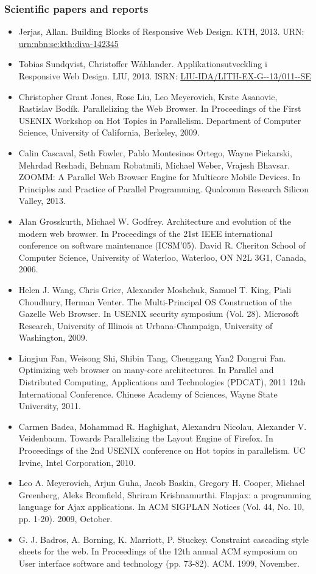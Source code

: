 \documentclass[oneside,a4paper,11pt]{kth-mag}
\begin{document}
\subsubsection{Scientific papers and reports}
\begin{itemize}
\item Jerjas, Allan. Building Blocks of Responsive Web Design. KTH, 2013. URN: \url{urn:nbn:se:kth:diva-142345}
\item Tobias Sundqvist, Christoffer Wåhlander. Applikationsutveckling i Responsive Web Design. LIU, 2013. ISRN: \url{LIU-IDA/LITH-EX-G--13/011--SE}
\item Christopher Grant Jones, Rose Liu, Leo Meyerovich, Krste Asanovic, Rastislav Bodík. Parallelizing the Web Browser. In Proceedings of the First USENIX Workshop on Hot Topics in Parallelism. Department of Computer Science, University of California, Berkeley, 2009.
\item Calin Cascaval, Seth Fowler, Pablo Montesinos Ortego, Wayne Piekarski, Mehrdad Reshadi, Behnam Robatmili, Michael Weber, Vrajesh Bhavsar. ZOOMM: A Parallel Web Browser Engine for Multicore Mobile Devices. In Principles and Practice of Parallel Programming. Qualcomm Research Silicon Valley, 2013.
\item Alan Grosskurth, Michael W. Godfrey. Architecture and evolution of the modern web browser. In Proceedings of the 21st IEEE international conference on software maintenance (ICSM'05). David R. Cheriton School of Computer Science, University of Waterloo, Waterloo, ON N2L 3G1, Canada, 2006.
\item Helen J. Wang, Chris Grier, Alexander Moshchuk, Samuel T. King, Piali Choudhury, Herman Venter. The Multi-Principal OS Construction of the Gazelle Web Browser. In USENIX security symposium (Vol. 28). Microsoft Research, University of Illinois at Urbana-Champaign, University of Washington, 2009.
\item Lingjun Fan, Weisong Shi, Shibin Tang, Chenggang Yan2 Dongrui Fan. Optimizing web browser on many-core architectures. In Parallel and Distributed Computing, Applications and Technologies (PDCAT), 2011 12th International Conference. Chinese Academy of Sciences, Wayne State University, 2011.
\item Carmen Badea, Mohammad R. Haghighat, Alexandru Nicolau, Alexander V. Veidenbaum. Towards Parallelizing the Layout Engine of Firefox. In Proceedings of the 2nd USENIX conference on Hot topics in parallelism. UC Irvine, Intel Corporation, 2010.
\item Leo A. Meyerovich, Arjun Guha, Jacob Baskin, Gregory H. Cooper, Michael Greenberg, Aleks Bromfield, Shriram Krishnamurthi. Flapjax: a programming language for Ajax applications. In ACM SIGPLAN Notices (Vol. 44, No. 10, pp. 1-20). 2009, October.
\item G. J. Badros, A. Borning, K. Marriott, P. Stuckey. Constraint cascading style sheets for the web. In Proceedings of the 12th annual ACM symposium on User interface software and technology (pp. 73-82). ACM. 1999, November.
\end{itemize}
\end{document}

